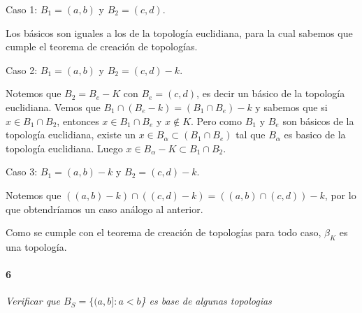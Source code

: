 \documentclass[12pt]{article}
\begin{document}
Caso 1: $B_1=(a,b)$ y $B_2=(c,d)$.

Los básicos son iguales a los de la topología euclidiana, para la cual sabemos que cumple el teorema de creación de topologías.
\vspace{0.15cm}

Caso 2: $B_1=(a,b)$ y  $B_2=(c,d)-k$.

Notemos que $B_2=B_e-K$ con $B_e=(c,d)$, es decir un básico de la topología euclidiana.
Vemos que \(B_1\cap(B_e-k)=(B_1\cap B_e)-k\) y sabemos que si \(x\in B_1 \cap B_2\), entonces \(x\in B_1 \cap B_e\) y $x\notin K$. 
Pero como \(B_1\) y \(B_e\) son básicos de la topología euclidiana, existe un \(x\in B_{\alpha} \subset (B_1\cap B_e)\) tal que \(B_{\alpha}\) es basico de la topología euclidiana.
Luego $x \in B_\alpha -K \subset B_1 \cap B_2$.
\vspace{0.15cm}

Caso 3: $B_1=(a,b)-k$ y $B_2=(c,d)-k$.

Notemos que \(((a,b)-k)\cap((c,d)-k)=((a,b)\cap(c,d))-k\), por lo que obtendríamos un caso análogo al anterior. 

Como se cumple con el teorema de creación de topologías para todo caso,  $\beta_K$ es una topología.
\paragraph{6}
\textit{Verificar que $B_S=\{(a,b]:a<b$\} es base de algunas topologias}
\end{document}
